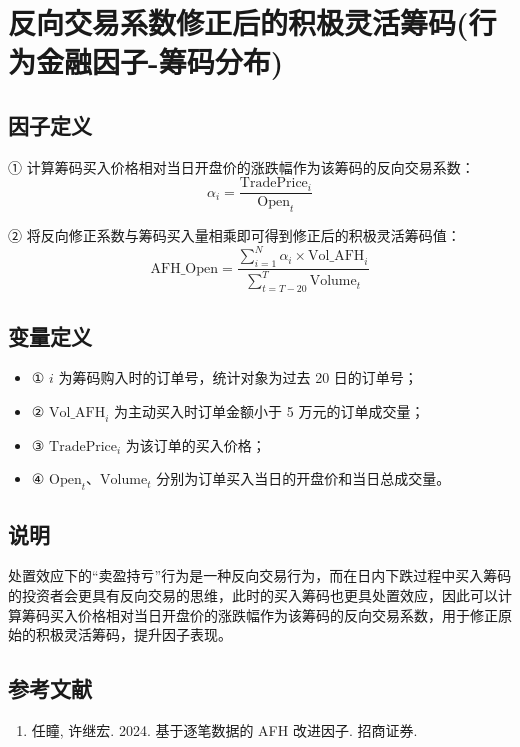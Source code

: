\documentclass{article}
\begin{document}
\section{反向交易系数修正后的积极灵活筹码(行为金融因子-筹码分布)}

\subsection{因子定义}
① 计算筹码买入价格相对当日开盘价的涨跌幅作为该筹码的反向交易系数：
\begin{equation}
    \alpha_i = \frac{\mathrm{TradePrice}_i}{\mathrm{Open}_t}
\end{equation}

② 将反向修正系数与筹码买入量相乘即可得到修正后的积极灵活筹码值：
\begin{equation}
    \mathrm{AFH\_Open} = \frac{\sum_{i=1}^{N} \alpha_i \times \mathrm{Vol\_AFH}_i}{\sum_{t=T-20}^{T} \mathrm{Volume}_t}
\end{equation}

\subsection{变量定义}
\begin{itemize}
    \item ① \( i \) 为筹码购入时的订单号，统计对象为过去 20 日的订单号；
    \item ② \( \mathrm{Vol\_AFH}_i \) 为主动买入时订单金额小于 5 万元的订单成交量；
    \item ③ \( \mathrm{TradePrice}_i \) 为该订单的买入价格；
    \item ④ \( \mathrm{Open}_t \)、\( \mathrm{Volume}_t \) 分别为订单买入当日的开盘价和当日总成交量。
\end{itemize}

\subsection{说明}
处置效应下的“卖盈持亏”行为是一种反向交易行为，而在日内下跌过程中买入筹码的投资者会更具有反向交易的思维，此时的买入筹码也更具处置效应，因此可以计算筹码买入价格相对当日开盘价的涨跌幅作为该筹码的反向交易系数，用于修正原始的积极灵活筹码，提升因子表现。

\subsection{参考文献}
\begin{enumerate}
    \item 任瞳, 许继宏. 2024. 基于逐笔数据的 AFH 改进因子. 招商证券.
\end{enumerate}
\end{document}
